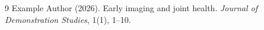 \ifbrightonbiblatex
  \printbibliography[heading=bibintoc,title={List of references}]
\else
  \begin{thebibliography}{9}
    Example Author (2026).
    \newblock Early imaging and joint health.
    \newblock \emph{Journal of Demonstration Studies}, 1(1), 1--10.
  \end{thebibliography}
\fi

